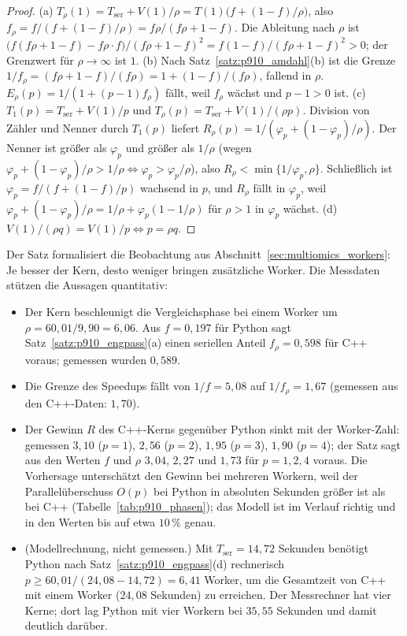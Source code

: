 \documentclass[a4paper,12pt, twoside]{report}
\theoremstyle{definition}
\begin{document}
\begin{proof}
(a) $T_\rho(1)=T_{\mathrm{ser}}+V(1)/\rho=T(1)\bigl(f+(1-f)/\rho\bigr)$, also $f_\rho=f/(f+(1-f)/\rho)=f\rho/(f\rho+1-f)$. Die Ableitung nach $\rho$ ist $\bigl(f(f\rho+1-f)-f\rho\cdot f\bigr)/(f\rho+1-f)^2=f(1-f)/(f\rho+1-f)^2>0$; der Grenzwert für $\rho\to\infty$ ist $1$.
(b) Nach Satz~\ref{satz:p910_amdahl}(b) ist die Grenze $1/f_\rho=(f\rho+1-f)/(f\rho)=1+(1-f)/(f\rho)$, fallend in $\rho$. $E_\rho(p)=1/(1+(p-1)f_\rho)$ fällt, weil $f_\rho$ wächst und $p-1>0$ ist.
(c) $T_1(p)=T_{\mathrm{ser}}+V(1)/p$ und $T_\rho(p)=T_{\mathrm{ser}}+V(1)/(\rho p)$. Division von Zähler und Nenner durch $T_1(p)$ liefert $R_\rho(p)=1/(\varphi_p+(1-\varphi_p)/\rho)$. Der Nenner ist größer als $\varphi_p$ und größer als $1/\rho$ (wegen $\varphi_p+(1-\varphi_p)/\rho>1/\rho\iff\varphi_p>\varphi_p/\rho$), also $R_\rho<\min\{1/\varphi_p,\rho\}$. Schließlich ist $\varphi_p=f/(f+(1-f)/p)$ wachsend in $p$, und $R_\rho$ fällt in $\varphi_p$, weil $\varphi_p+(1-\varphi_p)/\rho=1/\rho+\varphi_p(1-1/\rho)$ für $\rho>1$ in $\varphi_p$ wächst.
(d) $V(1)/(\rho q)=V(1)/p\iff p=\rho q$.
\end{proof}

Der Satz formalisiert die Beobachtung aus Abschnitt~\ref{sec:multiomics_workers}: Je besser der Kern, desto weniger bringen zusätzliche Worker. Die Messdaten stützen die Aussagen quantitativ:

\begin{itemize}
\item Der Kern beschleunigt die Vergleichsphase bei einem Worker um $\rho=60{,}01/9{,}90=6{,}06$. Aus $f=0{,}197$ für Python sagt Satz~\ref{satz:p910_engpass}(a) einen seriellen Anteil $f_\rho=0{,}598$ für C++ voraus; gemessen wurden $0{,}589$.
\item Die Grenze des Speedups fällt von $1/f=5{,}08$ auf $1/f_\rho=1{,}67$ (gemessen aus den C++-Daten: $1{,}70$).
\item Der Gewinn $R$ des C++-Kerns gegenüber Python sinkt mit der Worker-Zahl: gemessen $3{,}10$ ($p=1$), $2{,}56$ ($p=2$), $1{,}95$ ($p=3$), $1{,}90$ ($p=4$); der Satz sagt aus den Werten $f$ und $\rho$ $3{,}04$, $2{,}27$ und $1{,}73$ für $p=1,2,4$ voraus. Die Vorhersage unterschätzt den Gewinn bei mehreren Workern, weil der Parallelüberschuss $O(p)$ bei Python in absoluten Sekunden größer ist als bei C++ (Tabelle~\ref{tab:p910_phasen}); das Modell ist im Verlauf richtig und in den Werten bis auf etwa $10\,\%$ genau.
\item (Modellrechnung, nicht gemessen.) Mit $T_{\mathrm{ser}}=14{,}72$ Sekunden benötigt Python nach Satz~\ref{satz:p910_engpass}(d) rechnerisch $p\ge 60{,}01/(24{,}08-14{,}72)=6{,}41$ Worker, um die Gesamtzeit von C++ mit einem Worker ($24{,}08$ Sekunden) zu erreichen. Der Messrechner hat vier Kerne; dort lag Python mit vier Workern bei $35{,}55$ Sekunden und damit deutlich darüber.
\end{itemize}
\end{document}
